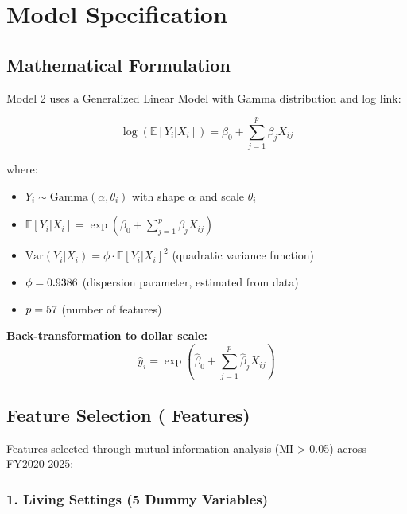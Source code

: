 \section{Model Specification}

\subsection{Mathematical Formulation}

Model 2 uses a Generalized Linear Model with Gamma distribution and log link:

\begin{equation}\label{eq:model2}
\log(\mathbb{E}[Y_i | X_i]) = \beta_0 + \sum_{j=1}^{p} \beta_j X_{ij}
\end{equation}

where:
\begin{itemize}
    \item $Y_i \sim \text{Gamma}(\alpha, \theta_i)$ with shape $\alpha$ and scale $\theta_i$
    \item $\mathbb{E}[Y_i | X_i] = \exp\left(\beta_0 + \sum_{j=1}^{p} \beta_j X_{ij}\right)$
    \item $\text{Var}(Y_i | X_i) = \phi \cdot \mathbb{E}[Y_i | X_i]^2$ (quadratic variance function)
    \item $\phi = 0.9386$ (dispersion parameter, estimated from data)
    \item $p = 57$ (number of features)
\end{itemize}

\textbf{Back-transformation to dollar scale:}
\begin{equation}
\hat{y}_i = \exp\left(\hat{\beta}_0 + \sum_{j=1}^{p} \hat{\beta}_j X_{ij}\right)
\end{equation}

\subsection{Feature Selection (\ModelTwoNumFeatures{} Features)}

Features selected through mutual information analysis (MI > 0.05) across FY2020-2025:

\subsubsection{1. Living Settings (5 Dummy Variables)}

